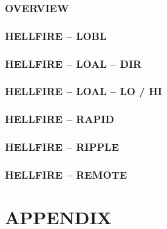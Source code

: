 \documentclass[fontInter]{TechCheck}
\begin{document}
	\subsection{OVERVIEW}
	\subsection{HELLFIRE -- LOBL}
	\subsection{HELLFIRE -- LOAL -- DIR}
	\subsection{HELLFIRE -- LOAL -- LO / HI}
	\subsection{HELLFIRE -- RAPID}
	\subsection{HELLFIRE -- RIPPLE}
	\subsection{HELLFIRE -- REMOTE}

	\cleardoublepage

	\chapter{APPENDIX}
	\minitoc
	\cleardoublepage



  \cleardoublepage

\iftoggle{print}{
	\pagestyle{superempty}
	\newpage \null
	\thumbwide
	\newpage \null
}{}
\end{document}
